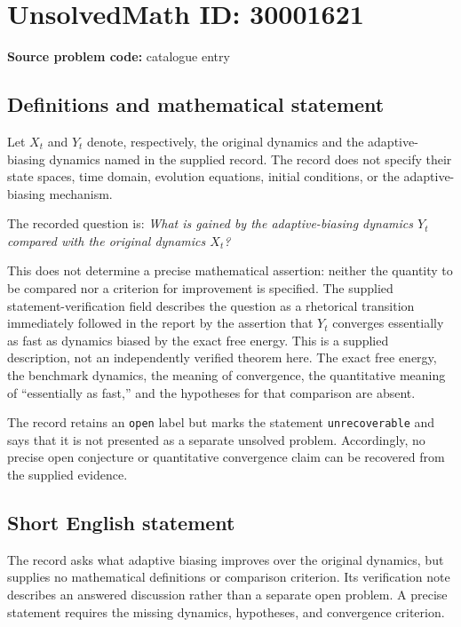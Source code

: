 \documentclass[11pt]{article}
\begin{document}
\section*{UnsolvedMath ID: 30001621}
\textbf{Source problem code:} catalogue entry
\subsection{Definitions and mathematical statement}
Let \(X_t\) and \(Y_t\) denote, respectively, the original dynamics and the adaptive-biasing dynamics named in the supplied record. The record does not specify their state spaces, time domain, evolution equations, initial conditions, or the adaptive-biasing mechanism.

The recorded question is: \emph{What is gained by the adaptive-biasing dynamics \(Y_t\) compared with the original dynamics \(X_t\)?}

This does not determine a precise mathematical assertion: neither the quantity to be compared nor a criterion for improvement is specified. The supplied statement-verification field describes the question as a rhetorical transition immediately followed in the report by the assertion that \(Y_t\) converges essentially as fast as dynamics biased by the exact free energy. This is a supplied description, not an independently verified theorem here. The exact free energy, the benchmark dynamics, the meaning of convergence, the quantitative meaning of ``essentially as fast,'' and the hypotheses for that comparison are absent.

The record retains an \texttt{open} label but marks the statement \texttt{unrecoverable} and says that it is not presented as a separate unsolved problem. Accordingly, no precise open conjecture or quantitative convergence claim can be recovered from the supplied evidence.
\subsection{Short English statement}
The record asks what adaptive biasing improves over the original dynamics, but supplies no mathematical definitions or comparison criterion. Its verification note describes an answered discussion rather than a separate open problem. A precise statement requires the missing dynamics, hypotheses, and convergence criterion.
\end{document}
